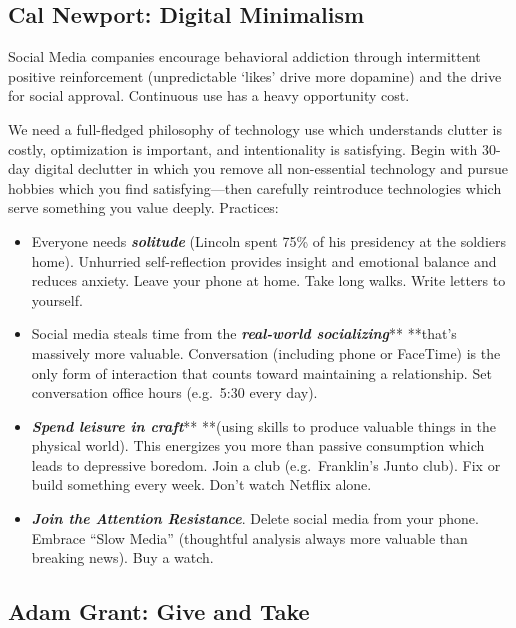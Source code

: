 \documentclass[
]{article}
\begin{document}
\hypertarget{cal-newport-digital-minimalism}{%
\subsection{Cal Newport: Digital
Minimalism}\label{cal-newport-digital-minimalism}}

Social Media companies encourage behavioral addiction through
intermittent positive reinforcement (unpredictable `likes' drive more
dopamine) and the drive for social approval. Continuous use has a heavy
opportunity cost.

We need a full-fledged philosophy of technology use which understands
clutter is costly, optimization is important, and intentionality is
satisfying. Begin with 30-day digital declutter in which you remove all
non-essential technology and pursue hobbies which you find
satisfying---then carefully reintroduce technologies which serve
something you value deeply. Practices:

\begin{itemize}
\item
  Everyone needs \textbf{\emph{solitude}} (Lincoln spent 75\% of his
  presidency at the soldiers home). Unhurried self-reflection provides
  insight and emotional balance and reduces anxiety. Leave your phone at
  home. Take long walks. Write letters to yourself.
\item
  Social media steals time from the \textbf{\emph{real-world
  socializing}}** **that's massively more valuable. Conversation
  (including phone or FaceTime) is the only form of interaction that
  counts toward maintaining a relationship. Set conversation office
  hours (e.g.~5:30 every day).
\item
  \textbf{\emph{Spend leisure in craft}}** **(using skills to produce
  valuable things in the physical world). This energizes you more than
  passive consumption which leads to depressive boredom. Join a club
  (e.g.~Franklin's Junto club). Fix or build something every week. Don't
  watch Netflix alone.
\item
  \textbf{\emph{Join the Attention Resistance}}. Delete social media
  from your phone. Embrace ``Slow Media'' (thoughtful analysis always
  more valuable than breaking news). Buy a watch.
\end{itemize}

\hypertarget{adam-grant-give-and-take}{%
\subsection{Adam Grant: Give and Take}\label{adam-grant-give-and-take}}
\end{document}
